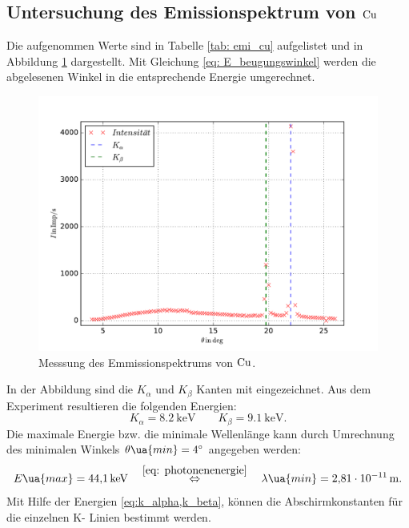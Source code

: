 \subsection{Untersuchung des Emissionspektrum von $\ce{Cu}$}
Die aufgenommen Werte sind in Tabelle \ref{tab: emi_cu} aufgelistet und in Abbildung \ref{fig: emission_cu} dargestellt.
Mit Gleichung \eqref{eq: E_beugungswinkel} werden die abgelesenen Winkel in die entsprechende Energie umgerechnet.

\begin{figure}
  \centering
  \includegraphics[width=1 \textwidth]{../Messdaten/emission_cu.pdf}
  \caption{Messsung des Emmissionspektrums von $\ce{Cu}$.} %
  \label{fig: emission_cu}
\end{figure}
In der Abbildung sind die $K_\alpha$ und $K_\beta$ Kanten mit eingezeichnet.
Aus dem Experiment resultieren die folgenden Energien:
\begin{equation}
  \label{eq:k_alpha,k_beta}
  K_\alpha=\SI{8.2}{\kilo\eV} \qquad   K_\beta=\SI{9.1}{\kilo\eV}.
\end{equation}
Die maximale Energie bzw. die minimale Wellenlänge kann durch Umrechnung des minimalen
Winkels $\theta\ua{min}=\SI{4}{\degree}$ angegeben werden:
\begin{equation}
  \label{eq: maximale_energie}
  E\ua{max}=\SI{44.1}{\kilo\eV} \quad \overset{\eqref{eq: photonenenergie}}{\Leftrightarrow} \quad \lambda\ua{min}=\SI{2.81e-11}{\meter}.
\end{equation}
Mit Hilfe der Energien \eqref{eq:k_alpha,k_beta}, können die Abschirmkonstanten
für die einzelnen K- Linien bestimmt werden.
